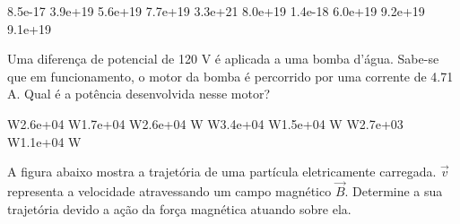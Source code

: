 \documentclass[12pt, addpoints]{exam}
\begin{document}
\begin{questions}
\begin{multicols*}{2}
\begin{oneparchoices}
\choice 8.5e-17 \choice 3.9e+19 \choice 5.6e+19 \choice 7.7e+19 \choice 3.3e+21 \choice 8.0e+19 \choice 1.4e-18 \choice 6.0e+19 \choice 9.2e+19 \choice 9.1e+19 
\end{oneparchoices}\question Uma diferença de potencial de 120 V é aplicada a uma bomba d’água. Sabe-se que em funcionamento, o motor da bomba é percorrido por uma corrente de    4.71 A. Qual é a potência desenvolvida nesse motor?

\begin{oneparchoices}
 W\choice 2.6e+04 W\choice 1.7e+04 W\choice 2.6e+04 W W\choice 3.4e+04 W\choice 1.5e+04 W W\choice 2.7e+03 W\choice 1.1e+04 W
\end{oneparchoices}\question A ﬁgura abaixo mostra a trajetória de uma partícula eletricamente carregada. $\vec{{v}}$ representa a velocidade atravessando um campo magnético $\vec{{B}}$. Determine a sua trajetória devido a ação da força magnética atuando sobre ela.
        
        \begin{center}
            \begin{minipage}[c]{0.5\linewidth}
            \end{minipage}
        \end{center}

        


\end{multicols*}
\end{questions}
\end{document}
